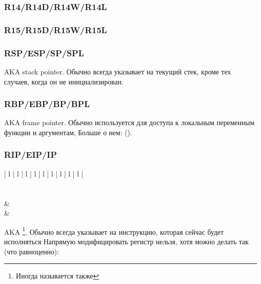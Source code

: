 \subsubsection{R14/R14D/R14W/R14L}

\subsubsection{R15/R15D/R15W/R15L}

\subsubsection{RSP/ESP/SP/SPL}

\ac{AKA} \gls{stack pointer}. Обычно всегда указывает на текущий стек, кроме тех случаев,
когда он не инициализирован.

\subsubsection{RBP/EBP/BP/BPL}

\ac{AKA} frame pointer. Обычно используется для доступа к локальным переменным функции и аргументам,
Больше о нем: ().

\subsubsection{RIP/EIP/IP}

\begin{center}
\begin{tabular}{ | l | l | l | l | l | l | l | l | l |}
\hline
\RegHeaderTop \\
\hline
\RegHeader \\
\hline
{} \\
\hline
{} &  \\
\hline
{} &  \\
\hline
\end{tabular}
\end{center}

\ac{AKA} 
\footnote{Иногда называется также }.
Обычно всегда указывает на инструкцию, которая сейчас будет исполняться
Напрямую модифицировать регистр нельзя, хотя можно делать так (что равноценно):

